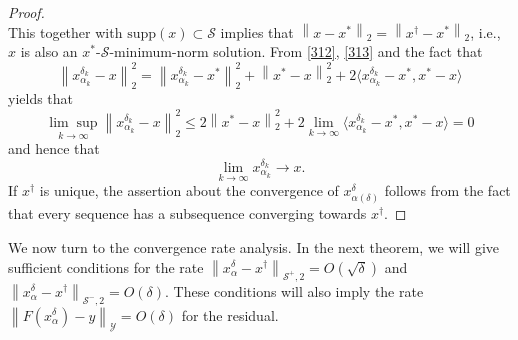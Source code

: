 \documentclass[11pt]{article}
\begin{document}
\begin{proof}
\begin{equation*}
\end{equation*}
This together with $ \mathrm{supp}(x)\subset\mathcal{S} $ implies that $ \left\|x - x^*\right\|_2 = \left\|x^\dagger - x^*\right\|_2 $, i.e., $ x $ is also an $ x^* $-$\mathcal{S}$-minimum-norm solution. From \eqref{312}, \eqref{313} and the fact that
\begin{displaymath}
\left\|x_{\alpha_k}^{\delta_k} - x\right\|_2^2 = \left\|x_{\alpha_k}^{\delta_k} - x^*\right\|_2^2 + \left\|x^* - x\right\|_2^2 + 2\langle x_{\alpha_k}^{\delta_k} - x^*, x^* - x\rangle
\end{displaymath}
yields that
\begin{displaymath}
\underset{k\to\infty}{\lim\sup}\left\|x_{\alpha_k}^{\delta_k} - x\right\|_2^2 \leq 2\left\|x^* - x\right\|_2^2 + 2\lim_{k\to \infty}\langle x_{\alpha_k}^{\delta_k} - x^*, x^* - x\rangle = 0
\end{displaymath}
and hence that
\begin{displaymath}
\lim_{k\to \infty}x_{\alpha_k}^{\delta_k}\to x.
\end{displaymath}
If $ x^\dagger $ is unique, the assertion about the convergence of $ x^\delta_{\alpha(\delta)} $ follows from the fact that every sequence has a subsequence converging towards $ x^\dagger $.
\end{proof}


We now turn to the convergence rate analysis. In the next theorem, we will give sufficient conditions for the rate $ \left\|x_\alpha^\delta - x^\dagger\right\|_{\mathcal{S}^+, 2} = O(\sqrt{\delta}) $ and $ \left\|x_\alpha^\delta - x^\dagger\right\|_{\mathcal{S}^-, 2} = O(\delta) $. 
These conditions will also imply the rate $ \left\|F(x_\alpha^\delta) - y\right\|_\mathcal{Y} = O(\delta) $ for the residual.
\end{document}
